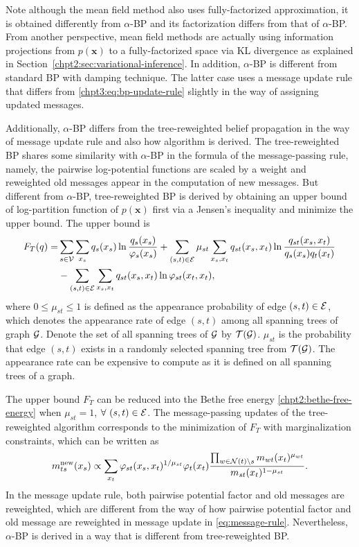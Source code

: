 Note although the mean field method also uses fully-factorized approximation, it is obtained differently from $\alpha$-BP and its factorization differs from that of $\alpha$-BP. From another perspective, mean field methods are actually using information projections from $p(\bm{x})$ to a fully-factorized space via KL divergence as explained in Section~\ref{chpt2:sec:variational-inference}.
In addition, $\alpha$-BP is different from standard BP with damping technique. The latter case uses a message update rule that differs from \eqref{chpt3:eq:bp-update-rule} slightly in the way of assigning updated messages. 


Additionally, $\alpha$-BP differs from the tree-reweighted belief propagation \cite{wainwright2008graphical} in the way of message update rule and also how algorithm is derived. 
The tree-reweighted BP shares some similarity with $\alpha$-BP in the formula of the message-passing rule, namely, the pairwise log-potential functions are scaled by a weight and reweighted old messages appear in the computation of new messages. But different from $\alpha$-BP, tree-reweighted BP is derived by obtaining an upper bound of log-partition function of $p(\bm{x})$ first via a Jensen's inequality and minimize the upper bound. The upper bound is
\begin{align}
  F_T(q) =& \sum_{s\in\mathcal{V}}\sum_{x_s}q_s(x_s) \ln{\frac{q_s(x_s)}{\varphi_s(x_s)}}  + \sum_{(s,t)\in\mathcal{E}}\mu_{st}\sum_{x_s, x_t} q_{st}(x_s, x_t) \ln\frac{q_{st}(x_s,x_t)}{q_s(x_s)q_t(x_t)} \nonumber \\
          & - \sum_{(s,t)\in\mathcal{E}}\sum_{x_s, x_t} q_{st}(x_s, x_t)\ln{\varphi_{st}(x_t, x_t)},
\end{align}
where $0\leq \mu_{st} \leq 1$ is defined as the appearance probability of edge $(s, t) \in \mathcal{E}$, which denotes the appearance rate of edge $(s,t)$ among all spanning trees of graph $\mathcal{G}$. Denote the set of all spanning trees of $\mathcal{G}$ by $\mathcal{T}(\mathcal{G})$. $\mu_{st}$ is the probability that edge $(s,t)$ exists in a randomly selected spanning tree from $\mathcal{T}(\mathcal{G})$. The appearance rate can be expensive to compute as it is defined on all spanning trees of a graph.


The upper bound $F_T$ can be reduced into the Bethe free energy \eqref{chpt2:bethe-free-energy} when $\mu_{st}=1$, $\forall ~(s,t)\in \mathcal{E}$. The message-passing updates of the tree-reweighted algorithm corresponds to the minimization of $F_T$ with marginalization constraints, which can be written as
\begin{align}
  {m}^{\text{new}}_{ts}(x_s) \propto \sum_{x_t} \varphi_{st}(x_s, x_t)^{1/\mu_{st}} {\varphi}_t(x_t) \frac{\prod_{w\in \mathcal{N}(t)\backslash s}m_{wt}(x_t)^{\mu_{wt}} }{m_{st}(x_t)^{1-\mu_{st}}}.
\end{align}
In the message update rule, both pairwise potential factor and old messages are reweighted, which are different from the way of how pairwise potential factor and old message are reweighted in message update in \eqref{eq:message-rule}. Nevertheless, $\alpha$-BP is derived in a way that is different from tree-reweighted BP.

